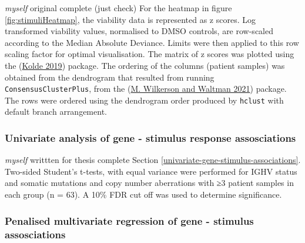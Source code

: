 \documentclass[11pt, a4paper, twosided]{book}
\begin{document}
\emph{myself} original complete (just check)
For the heatmap in figure \ref{fig:stimuliHeatmap}, the viability data is represented as z scores. Log transformed viability values, normalised to DMSO controls, are row-scaled according to the Median Absolute Deviance. Limits were then applied to this row scaling factor for optimal visualisation. The matrix of z scores was plotted using the (\protect\hyperlink{ref-R-pheatmap}{Kolde 2019}) package. The ordering of the columns (patient samples) was obtained from the dendrogram that resulted from running \texttt{ConsensusClusterPlus}, from the (\protect\hyperlink{ref-R-ConsensusClusterPlus}{M. Wilkerson and Waltman 2021}) package. The rows were ordered using the dendrogram order produced by \texttt{hclust} with default branch arrangement.

\hypertarget{univariate-analysis-of-gene---stimulus-response-assosciations}{%
\subsubsection{Univariate analysis of gene - stimulus response assosciations}\label{univariate-analysis-of-gene---stimulus-response-assosciations}}

\emph{myself} writtten for thesis complete
Section \ref{univariate-gene-stimulus-associations}. Two-sided Student's t-tests, with equal variance were performed for IGHV status and somatic mutations and copy number aberrations with ≥3 patient samples in each group (n = 63). A 10\% FDR cut off was used to determine significance.

\hypertarget{multivariate-gene-stimulus-assosciations-method}{%
\subsubsection{Penalised multivariate regression of gene - stimulus assosciations}\label{multivariate-gene-stimulus-assosciations-method}}
\end{document}
